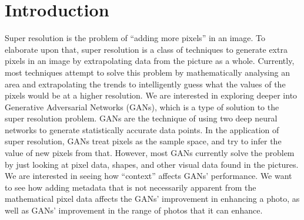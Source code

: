 \section{Introduction}

Super resolution is the problem of “adding more pixels” in an image. To elaborate upon that, super resolution is a class of techniques to generate extra pixels in an image by extrapolating data from the picture as a whole. Currently, most techniques attempt to solve this problem by mathematically analysing an area and extrapolating the trends to intelligently guess what the values of the pixels would be at a higher resolution. We are interested in exploring deeper into Generative Adversarial Networks (GANs), which is a type of solution to the super resolution problem. GANs are the technique of using two deep neural networks to generate statistically accurate data points. In the application of super resolution, GANs treat pixels as the sample space, and try to infer the value of new pixels from that. However, most GANs currently solve the problem by just looking at pixel data, shapes, and other visual data found in the pictures. We are interested in seeing how “context” affects GANs’ performance. We want to see how adding metadata that is not necessarily apparent from the mathematical pixel data affects the GANs’ improvement in enhancing a photo, as well as GANs’ improvement in the range of photos that it can enhance.
